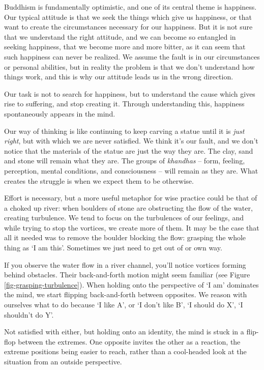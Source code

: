 
Buddhism is fundamentally optimistic, and one of its central theme is
happiness. Our typical attitude is that we seek the things which give us
happiness, or that want to create the circumstances necessary for our
happiness. But it is not sure that we understand the right attitude, and
we can become so entangled in seeking happiness, that we become more and
more bitter, as it can seem that such happiness can never be realized.
We assume the fault is in our circumstances or personal abilities, but
in reality the problem is that we don't understand how things work, and
this is why our attitude leads us in the wrong direction.

Our task is not to search for happiness, but to understand the cause
which gives rise to suffering, and stop creating it. Through
understanding this, happiness spontaneously appears in the mind.

Our way of thinking is like continuing to keep carving a statue until it
is \emph{just right}, but with which we are never satisfied. We think
it's our fault, and we don't notice that the materials of the statue are
just the way they are. The clay, sand and stone will remain what they
are. The groups of \emph{khandhas} -- form, feeling, perception, mental
conditions, and consciousness -- will remain as they are. What creates
the struggle is when we expect them to be otherwise.

Effort is necessary, but a more useful metaphor for wise practice could
be that of a choked up river: when boulders of stone are obstructing the
flow of the water, creating turbulence. We tend to focus on the
turbulences of our feelings, and while trying to stop the vortices, we
create more of them. It may be the case that all it needed was to remove
the boulder blocking the flow: grasping the whole thing as `I am this'.
Sometimes we just need to get out of or own way.

If you observe the water flow in a river channel, you'll notice vortices
forming behind obstacles. Their back-and-forth motion might seem
familiar (see Figure \ref{fig-grasping-turbulence}). When holding onto
the perspective of `I am' dominates the mind, we start flipping
back-and-forth between opposites. We reason with ourselves what to do
because `I like A', or `I don't like B', `I should do X', `I shouldn't
do Y'.

Not satisfied with either, but holding onto an identity, the mind is
stuck in a flip-flop between the extremes. One opposite invites the
other as a reaction, the extreme positions being easier to reach, rather
than a cool-headed look at the situation from an outside perspective.

